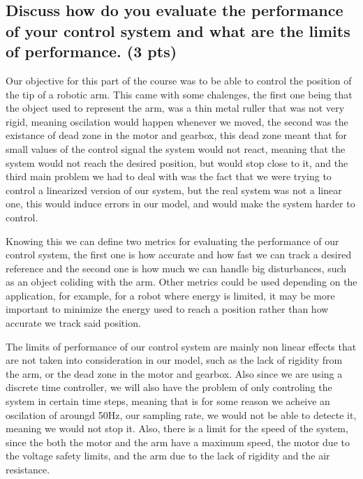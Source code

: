 \subsection{Discuss how do you evaluate the performance of your control system and what are the limits of performance. (3 pts)}
\vspace{10pt}


Our objective for this part of the course was to be able to control the position of the tip of a robotic arm. This came with some chalenges, the first one being that the object used to represent the arm, was a thin metal ruller that was not very rigid, meaning oscilation would happen whenever we moved, the second was the existance of dead zone in the motor and gearbox, this dead zone meant that for small values of the control signal the system would not react, meaning that the system would not reach the desired position, but would stop close to it, and the third main problem we had to deal with was the fact that we were trying to control a linearized version of our system, but the real system was not a linear one, this would induce errors in our model, and would make the system harder to control.

Knowing this we can define two metrics for evaluating the performance of our control system, the first one is how accurate and how fast we can track a desired reference and the second one is how much we can handle big disturbances, such as an object coliding with the arm. Other metrics could be used depending on the application, for example, for a robot where energy is limited, it may be more important to minimize the energy used to reach a position rather than how accurate we track said position.

The limits of performance of our control system are mainly non linear effects that are not taken into consideration in our model, such as the lack of rigidity from the arm, or the dead zone in the motor and gearbox. Also since we are using a discrete time controller, we will also have the problem of only controling  the system in certain time steps, meaning that is for some reason we acheive an oscilation of aroungd 50Hz, our sampling rate, we would not be able to detecte it, meaning we would not stop it. Also, there is a limit for the speed of the system, since the both the motor and the arm have a maximum speed, the motor due to the voltage safety limits, and the arm due to the lack of rigidity and the air resistance.

